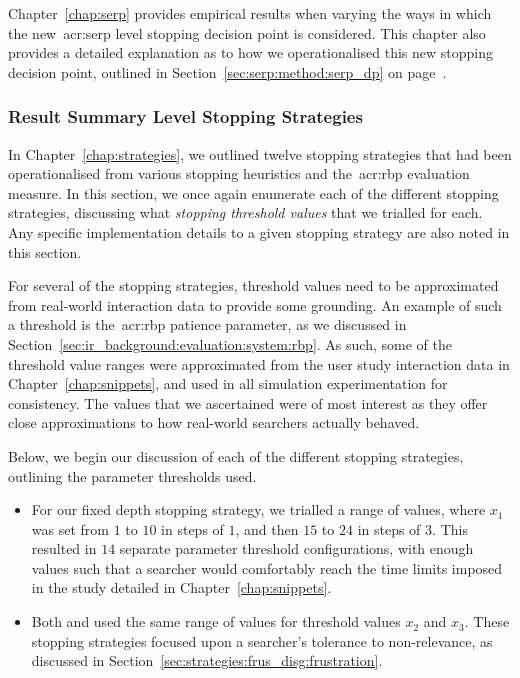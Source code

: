 Chapter~\ref{chap:serp} provides empirical results when varying the ways in which the new~\gls{acr:serp} level stopping decision point is considered. This chapter also provides a detailed explanation as to how we operationalised this new stopping decision point, outlined in Section~\ref{sec:serp:method:serp_dp} on page~\pageref{sec:serp:method:serp_dp}.

\subsubsection{Result Summary Level Stopping Strategies}\label{sec:method:simulation:grounding:stopping}
In Chapter~\ref{chap:strategies}, we outlined twelve stopping strategies that had been operationalised from various stopping heuristics and the~\gls{acr:rbp} evaluation measure. In this section, we once again enumerate each of the different stopping strategies, discussing what \emph{stopping threshold values} that we trialled for each. Any specific implementation details to a given stopping strategy are also noted in this section.

For several of the stopping strategies, threshold values need to be approximated from real-world interaction data to provide some grounding. An example of such a threshold is the~\gls{acr:rbp} patience parameter, as we discussed in Section~\ref{sec:ir_background:evaluation:system:rbp}. As such, some of the threshold value ranges were approximated from the user study interaction data in Chapter~\ref{chap:snippets}, and used in all simulation experimentation for consistency. The values that we ascertained were of most interest as they offer close approximations to how real-world searchers actually behaved.

Below, we begin our discussion of each of the different stopping strategies, outlining the parameter thresholds used.

\begin{itemize}
    \item{ For our fixed depth stopping strategy, we trialled a range of values, where $x_1$ was set from $1$ to $10$ in steps of $1$, and then $15$ to $24$ in steps of $3$. This resulted in $14$ separate parameter threshold configurations, with enough values such that a searcher would comfortably reach the time limits imposed in the study detailed in Chapter~\ref{chap:snippets}.}
    
    \item{Both  and  used the same range of values for threshold values $x_2$ and $x_3$. These stopping strategies focused upon a searcher's tolerance to non-relevance, as discussed in Section~\ref{sec:strategies:frus_disg:frustration}.}
\end{itemize}

